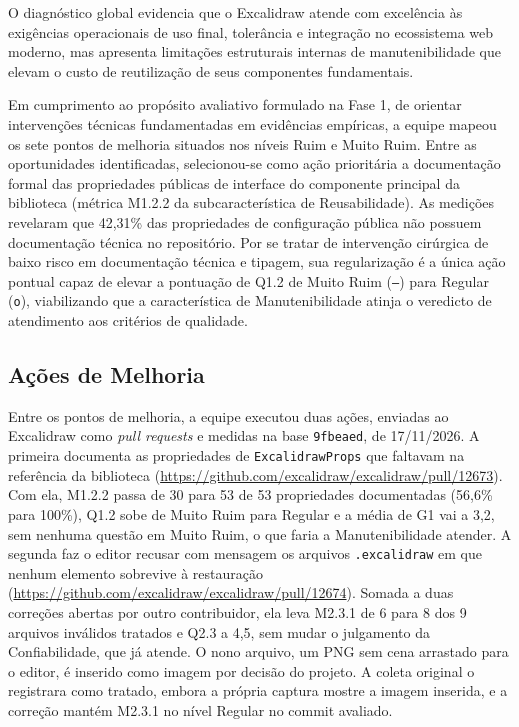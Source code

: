 \documentclass[12pt]{article}
\begin{document}
O diagnóstico global evidencia que o Excalidraw atende com excelência às exigências operacionais de uso final, tolerância e integração no ecossistema web moderno, mas apresenta limitações estruturais internas de manutenibilidade que elevam o custo de reutilização de seus componentes fundamentais.

Em cumprimento ao propósito avaliativo formulado na Fase 1, de orientar intervenções técnicas fundamentadas em evidências empíricas, a equipe mapeou os sete pontos de melhoria situados nos níveis Ruim e Muito Ruim. Entre as oportunidades identificadas, selecionou-se como ação prioritária a documentação formal das propriedades públicas de interface do componente principal da biblioteca (métrica M1.2.2 da subcaracterística de Reusabilidade). As medições revelaram que 42,31\% das propriedades de configuração pública não possuem documentação técnica no repositório. Por se tratar de intervenção cirúrgica de baixo risco em documentação técnica e tipagem, sua regularização é a única ação pontual capaz de elevar a pontuação de Q1.2 de Muito Ruim (\texttt{--}) para Regular (\texttt{o}), viabilizando que a característica de Manutenibilidade atinja o veredicto de atendimento aos critérios de qualidade.

\subsection{Ações de Melhoria}
\label{sec:acoes-melhoria}

Entre os pontos de melhoria, a equipe executou duas ações, enviadas ao Excalidraw como \textit{pull requests} e medidas na base \texttt{9fbeaed}, de 17/11/2026. A primeira documenta as propriedades de \texttt{ExcalidrawProps} que faltavam na referência da biblioteca (\url{https://github.com/excalidraw/excalidraw/pull/12673}). Com ela, M1.2.2 passa de 30 para 53 de 53 propriedades documentadas (56,6\% para 100\%), Q1.2 sobe de Muito Ruim para Regular e a média de G1 vai a 3,2, sem nenhuma questão em Muito Ruim, o que faria a Manutenibilidade atender. A segunda faz o editor recusar com mensagem os arquivos \texttt{.excalidraw} em que nenhum elemento sobrevive à restauração (\url{https://github.com/excalidraw/excalidraw/pull/12674}). Somada a duas correções abertas por outro contribuidor, ela leva M2.3.1 de 6 para 8 dos 9 arquivos inválidos tratados e Q2.3 a 4,5, sem mudar o julgamento da Confiabilidade, que já atende. O nono arquivo, um PNG sem cena arrastado para o editor, é inserido como imagem por decisão do projeto. A coleta original o registrara como tratado, embora a própria captura mostre a imagem inserida, e a correção mantém M2.3.1 no nível Regular no commit avaliado.
\end{document}
